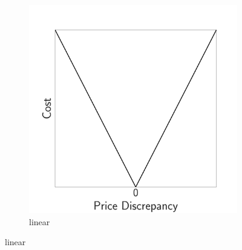 \documentclass[11pt]{article}
\begin{document}
\begin{figure}[!t]
     \centering
     \begin{subfigure}{0.38\textwidth}
         \centering
         \includegraphics[width=\textwidth]{fig/use-case-linear.pdf}
         \caption{linear}
         \label{fig:use-case-linear}
     \end{subfigure}
     

\end{figure}
\end{document}
